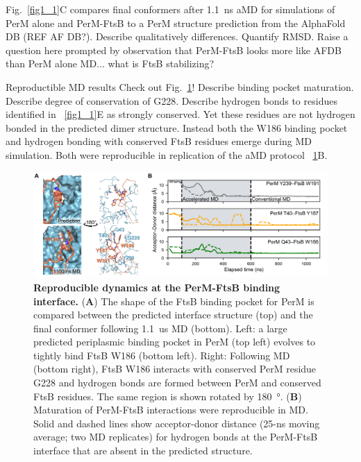 \documentclass[pdflatex,sn-basic]{sn-jnl}%
\begin{document}

Fig.~\ref{fig1_1}C compares final conformers after 1.1~ns aMD for simulations of PerM alone and PerM-FtsB to a PerM structure prediction from the AlphaFold DB (REF AF DB?).
Describe qualitatively differences.
Quantify RMSD.
Raise a question here prompted by observation that PerM-FtsB looks more like AFDB than PerM alone MD... what is FtsB stabilizing?

Reproductible MD results Check out Fig.~\ref{fig1_2}!
Describe binding pocket maturation.
Describe degree of conservation of G228.
Describe hydrogen bonds to residues identified in ~\ref{fig1_1}E as strongly conserved.
Yet these residues are not hydrogen bonded in the predicted dimer structure.
Instead both the W186 binding pocket and hydrogen bonding with conserved FtsB residues emerge during MD simulation. Both were reproducible in replication of the aMD protocol ~\ref{fig1_2}B.

\begin{figure}[h]
\centering
\includegraphics[width=1.0\textwidth]{../figures/fig1_2.png}
\caption{\textbf{Reproducible dynamics at the PerM-FtsB binding interface.} (\textbf{A}) The shape of the FtsB binding pocket for PerM is compared between the predicted interface structure (top) and the final conformer following \qty{1.1}{us} MD (bottom). Left: a large predicted periplasmic binding pocket in PerM (top left) evolves to tightly bind FtsB W186 (bottom left). Right: Following MD (bottom right), FtsB W186 interacts with conserved PerM residue G228 and hydrogen bonds are formed between PerM and conserved FtsB residues. The same region is shown rotated by \qty{180}{\degree}. (\textbf{B}) Maturation of PerM-FtsB interactions were reproducible in MD. Solid and dashed lines show acceptor-donor distance (25-ns moving average; two MD replicates) for hydrogen bonds at the PerM-FtsB interface that are absent in the predicted structure.}\label{fig1_2}
\end{figure}
\end{document}
